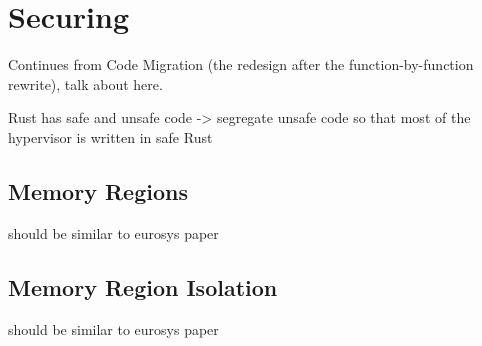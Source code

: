 \chapter{Securing \rustcore{}}
\label{sec:securercore}

Continues from Code Migration (the redesign after the function-by-function
rewrite), talk about \rustcore{} here.

Rust has safe and unsafe code -> segregate unsafe code so that most of the
hypervisor is written in safe Rust

\section{\rustcore{} Memory Regions}

should be similar to eurosys paper

\section{Memory Region Isolation}

should be similar to eurosys paper
